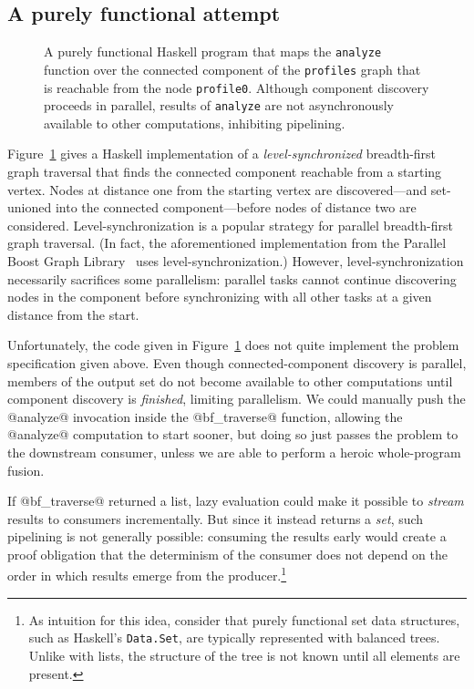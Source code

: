 \subsection{A purely functional attempt}

\begin{figure}
  
  \caption{A purely functional Haskell program that maps the
    \lstinline|analyze| function over the connected component of the
    \lstinline|profiles| graph that is reachable from the node
    \lstinline|profile0|.  Although component discovery proceeds in
    parallel, results of \lstinline|analyze| are not asynchronously
    available to other computations, inhibiting pipelining.}
  \label{f:bfs-pure}
\end{figure}

Figure~\ref{f:bfs-pure} gives a Haskell implementation of a
\emph{level-synchronized} breadth-first graph traversal that finds the
connected component reachable from a starting vertex.  Nodes at
distance one from the starting vertex are discovered---and set-unioned
into the connected component---before nodes of distance two are
considered.  Level-synchronization is a popular strategy for parallel
breadth-first graph traversal.  (In fact, the aforementioned
implementation from the Parallel Boost Graph Library~\cite{bfs-pbgl}
uses level-synchronization.)  However, level-synchronization necessarily sacrifices some
parallelism: parallel tasks cannot continue
discovering nodes in the component before synchronizing with all other
tasks at a given distance from the start.

Unfortunately, the code given in Figure~\ref{f:bfs-pure} does not
quite implement the problem specification given above.  Even though
connected-component discovery is parallel, members of the output set
do not become available to other computations until component
discovery is \emph{finished}, limiting parallelism.  We could
manually push the @analyze@ invocation inside the @bf_traverse@
function, allowing the @analyze@ computation to start sooner, but
doing so just passes the problem to the downstream consumer, unless
we are able to perform a heroic whole-program fusion.

If @bf_traverse@ returned a list, lazy evaluation could make it
possible to \emph{stream} results to consumers incrementally.  But
since it instead returns a \emph{set}, such pipelining is not
generally possible: consuming the results early would create a proof
obligation that the determinism of the consumer does not depend on the
order in which results emerge from the producer.\footnote{As intuition
  for this idea, consider that purely functional set data structures,
  such as Haskell's \lstinline|Data.Set|, are typically represented
  with balanced trees.  Unlike with lists, the structure of the tree
  is not known until all elements are present.}

